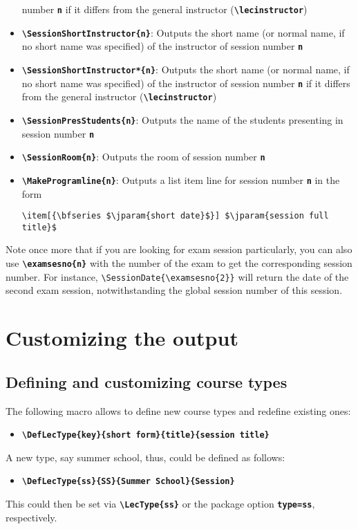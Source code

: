 \documentclass[english]{article}
\newcommand*\jmacro[1]{\textbf{\texttt{#1}}}
\newcommand*\jcsmacro[1]{\jmacro{\textbackslash{#1}}}
\newcommand*\joption[1]{\textbf{\texttt{#1}}}
\newcommand*\jparam[1]{\angus #1\angud}
\begin{document}
\begin{itemize}
number \joption{\jparam{n}} if it differs from the general instructor (\jcsmacro{lecinstructor})
\item \jcsmacro{SessionShortInstructor\{\jparam{n}\}}: Outputs the short name (or normal name, if no short name was specified) of the instructor of session
number \joption{\jparam{n}}
\item \jcsmacro{SessionShortInstructor*\{\jparam{n}\}}: Outputs the short name  (or normal name, if no short name was specified) of the instructor of session
number \joption{\jparam{n}} if it differs from the general instructor (\jcsmacro{lecinstructor})
\item \jcsmacro{SessionPresStudents\{\jparam{n}\}}: Outputs the name of the students presenting
in session number \joption{\jparam{n}}
\item \jcsmacro{SessionRoom\{\jparam{n}\}}: Outputs the room of session number \joption{\jparam{n}}
\item \jcsmacro{MakeProgramline\{\jparam{n}\}}: Outputs a list
item line for session number \joption{\jparam{n}} in the form
\begin{lstlisting}[language={[LaTeX]TeX},basicstyle={\small\ttfamily},
                   escapechar=\$,frame=single]
\item[{\bfseries $\jparam{short date}$}] $\jparam{session full title}$
\end{lstlisting}

\end{itemize}
%
Note once more that if you are looking for exam session particularly, you can also use
\jcsmacro{examsesno\{\jparam{n}\}} with the number of the exam to get the
corresponding session number. For instance, \verb|\SessionDate{\examsesno{2}}|
will return the date of the second exam session, notwithstanding the global
session number of this session.


\section{Customizing the output}\label{sec:customizing-strings}

\subsection{Defining and customizing course types}

The following macro allows to define new course types and redefine existing ones:
\begin{itemize}
\item \jcsmacro{DefLecType\{\jparam{key}\}\{\jparam{short form}\}\{\jparam{title}\}\{\jparam{session title}\}}
\end{itemize}
A new type, say summer school, thus, could be defined as follows:
\begin{itemize}
\item \jcsmacro{DefLecType\{ss\}\{SS\}\{Summer School\}\{Session\}}
\end{itemize}
This could then be set via \jcsmacro{LecType\{ss\}} or the package option
\joption{type=ss}, respectively.
\end{document}
